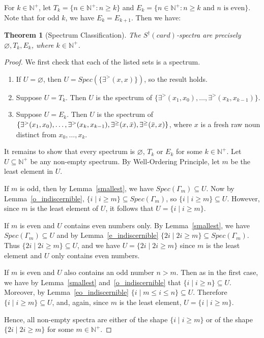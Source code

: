 \documentclass[12pt, reqno]{amsart}
\newtheorem{theorem}{Theorem}[section]
\theoremstyle{definition}
\theoremstyle{remark}
\numberwithin{equation}{section}
\begin{document}
For $k\in\mathbb{N}^+$, let $T_k=\{n\in\mathbb{N}^+:n\geq k\}$ and $E_k=\{n\in\mathbb{N}^+:n\geq k
\text{ and }n\text{ is even}\}.$ Note that for odd $k$, we have $E_k = E_{k+1}$. Then we have:

\begin{theorem}[Spectrum Classification]\label{main}
The $S^\dagger(card)$-spectra are precisely $\varnothing, T_k, E_k$, where $k\in\mathbb{N}^+$.
\end{theorem}

\begin{proof}

	We first check that each of the listed sets is a spectrum.
	\begin{enumerate} 
		\item If $U=\varnothing$, then $U=Spec(\{\exists^{>}(x,x)\})$, so the result holds.
		
		\item Suppose $U=T_k$. Then $U$ is the spectrum of $\{
	\exists^{>}(x_1,x_0),
	\ldots,
	\exists^{>}(x_k,x_{k-1})
	\}.$

	\item Suppose $U=E_k$. Then $U$ is the spectrum of $\{
	\exists^{>}(x_1,x_0),
	\ldots,
	\exists^{>}(x_k,x_{k-1}),\\
	\exists^{\geq}(x,\bar x),
	\exists^{\geq}(\bar x,x)
	\}$, where $x$ is a fresh raw noun distinct from $x_0,\dots,x_k$. 
	\end{enumerate}

	It remains to show that every spectrum is $\varnothing$, $T_k$ or $E_k$ for some
	$k \in \mathbb{N}^+$. Let $U \subseteq \mathbb{N}^+$ be any non-empty spectrum. By Well-Ordering Principle, let $m$ be the least element in $U$. 
	
	If $m$ is odd, then by Lemma~\ref{smallest}, we have $Spec(\Gamma_m) \subseteq U$. Now by Lemma~\ref{o_indiscernible}, $\{i \mid i \geq m\}\subseteq Spec(\Gamma_m)$, so $\{i \mid i \geq m\}\subseteq U$. However, since $m$ is the least element of $U$, it follows that $U = \{i \mid i \geq m\}$. 
	
	If $m$ is even and $U$ contains even numbers only. By Lemma~\ref{smallest}, we have $Spec(\Gamma_m) \subseteq U$ and by Lemma~\ref{e_indiscernible} $\{2i \mid 2i \geq m \} \subseteq Spec(\Gamma_m)$. Thus $\{2i \mid 2i \geq m \} \subseteq U$, and we have $U = \{2i \mid 2i \geq m \}$ since $m$ is the least element and $U$ only contains even numbers. 
	
	If $m$ is even and $U$ also contains an odd number $n >m$. Then as in the first case, we have by  Lemma~\ref{smallest} and~\ref{o_indiscernible} that $\{i \mid i \geq n\}\subseteq U$. Moreover, by Lemma~\ref{eo_indiscernible} $\{i \mid m \leq i \leq n\} \subseteq U$. Therefore $\{i \mid i \geq m\} \subseteq U$, and, again, since $m$ is the least element, $U = \{i \mid i \geq m\}$. 
	
	Hence, all non-empty spectra are either of the shape $\{i \mid i \geq m\}$ or of the shape $\{2i \mid 2i \geq m \}$ for some $m \in \mathbb{N}^+$.
\end{proof}
\end{document}

